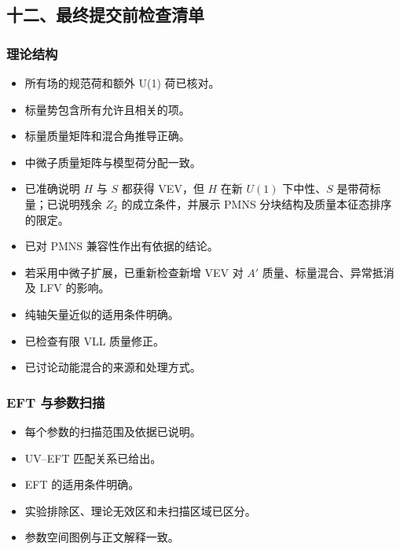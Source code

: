 \documentclass[
]{article}
\providecommand{\tightlist}{%
  \setlength{\itemsep}{0pt}\setlength{\parskip}{0pt}}
\begin{document}
\subsection{十二、最终提交前检查清单}\label{ux5341ux4e8cux6700ux7ec8ux63d0ux4ea4ux524dux68c0ux67e5ux6e05ux5355}

\subsubsection{理论结构}\label{ux7406ux8bbaux7ed3ux6784}

\begin{itemize}
\tightlist
\item[$\square$]
  所有场的规范荷和额外 U(1) 荷已核对。
\item[$\square$]
  标量势包含所有允许且相关的项。
\item[$\square$]
  标量质量矩阵和混合角推导正确。
\item[$\square$]
  中微子质量矩阵与模型荷分配一致。
\item[$\square$]
  已准确说明 \(H\) 与 \(S\) 都获得 VEV，但 \(H\) 在新 \(U(1)\)
  下中性、\(S\) 是带荷标量；已说明残余 \(Z_2\) 的成立条件，并展示 PMNS
  分块结构及质量本征态排序的限定。
\item[$\square$]
  已对 PMNS 兼容性作出有依据的结论。
\item[$\square$]
  若采用中微子扩展，已重新检查新增 VEV 对 \(A'\)
  质量、标量混合、异常抵消及 LFV 的影响。
\item[$\square$]
  纯轴矢量近似的适用条件明确。
\item[$\square$]
  已检查有限 VLL 质量修正。
\item[$\square$]
  已讨论动能混合的来源和处理方式。
\end{itemize}

\subsubsection{EFT 与参数扫描}\label{eft-ux4e0eux53c2ux6570ux626bux63cf}

\begin{itemize}
\tightlist
\item[$\square$]
  每个参数的扫描范围及依据已说明。
\item[$\square$]
  UV--EFT 匹配关系已给出。
\item[$\square$]
  EFT 的适用条件明确。
\item[$\square$]
  实验排除区、理论无效区和未扫描区域已区分。
\item[$\square$]
  参数空间图例与正文解释一致。
\end{itemize}
\end{document}
